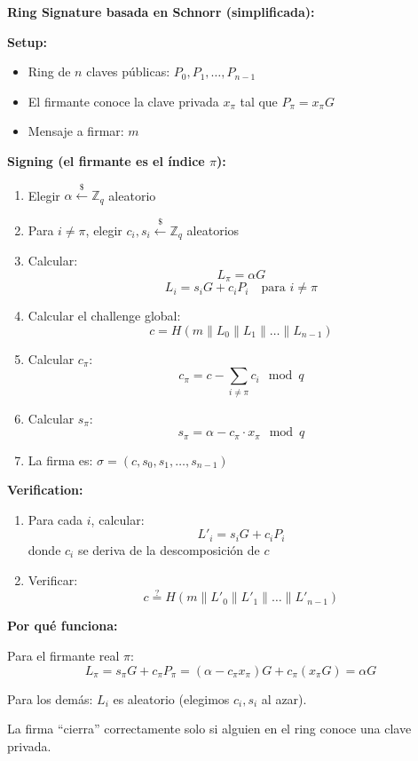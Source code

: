 \documentclass[11pt,a4paper,twoside]{book}
\begin{document}
\begin{mathnote}
\textbf{Ring Signature basada en Schnorr (simplificada):}

\textbf{Setup:}
\begin{itemize}
    \item Ring de $n$ claves p\'ublicas: $P_0, P_1, \ldots, P_{n-1}$
    \item El firmante conoce la clave privada $x_\pi$ tal que $P_\pi = x_\pi G$
    \item Mensaje a firmar: $m$
\end{itemize}

\textbf{Signing (el firmante es el \'indice $\pi$):}

\begin{enumerate}
    \item Elegir $\alpha \xleftarrow{\$} \mathbb{Z}_q$ aleatorio
    \item Para $i \neq \pi$, elegir $c_i, s_i \xleftarrow{\$} \mathbb{Z}_q$ aleatorios
    \item Calcular:
    \[ L_\pi = \alpha G \]
    \[ L_i = s_i G + c_i P_i \quad \text{para } i \neq \pi \]
    
    \item Calcular el challenge global:
    \[ c = H(m \| L_0 \| L_1 \| \ldots \| L_{n-1}) \]
    
    \item Calcular $c_\pi$:
    \[ c_\pi = c - \sum_{i \neq \pi} c_i \mod q \]
    
    \item Calcular $s_\pi$:
    \[ s_\pi = \alpha - c_\pi \cdot x_\pi \mod q \]
    
    \item La firma es: $\sigma = (c, s_0, s_1, \ldots, s_{n-1})$
\end{enumerate}

\textbf{Verification:}

\begin{enumerate}
    \item Para cada $i$, calcular:
    \[ L'_i = s_i G + c_i P_i \]
    donde $c_i$ se deriva de la descomposici\'on de $c$
    
    \item Verificar:
    \[ c \stackrel{?}{=} H(m \| L'_0 \| L'_1 \| \ldots \| L'_{n-1}) \]
\end{enumerate}

\textbf{Por qu\'e funciona:}

Para el firmante real $\pi$:
\[ L_\pi = s_\pi G + c_\pi P_\pi = (\alpha - c_\pi x_\pi) G + c_\pi (x_\pi G) = \alpha G \]

Para los dem\'as: $L_i$ es aleatorio (elegimos $c_i, s_i$ al azar).

La firma ``cierra'' correctamente solo si alguien en el ring conoce una clave privada.
\end{mathnote}
\end{document}
